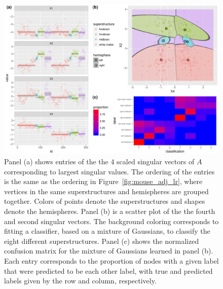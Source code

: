 \documentclass[journal,twoside,web]{ieeecolor}
\begin{document}
\begin{figure}[tbh!]
	\centering
	\includegraphics[width=.90\linewidth]{mouse_connectome_ase_w_error_table.pdf}
	\caption{
	Panel (a) shows entries of the the 4 scaled singular vectors  of $A$ corresponding to largest singular values.
	The ordering of the entries is the same as the ordering in Figure~\ref{fig:mouse_adj_lr}, where vertices in the same superstructures and hemispheres are grouped together. 
	Colors of points denote the superstructures and shapes denote the hemispheres.
	Panel (b) is a scatter plot of the the fourth and second singular vectors. 
	The background coloring corresponds to fitting a classifier, based on a mixture of Gaussians, to classify the eight different superstructures.
	Panel (c) shows the normalized confusion matrix for the mixture of Gaussians learned in panel (b).
    Each entry corresponds to the proportion of nodes with a given label that were predicted to be each other label,
    with true and predicted labels given by the row and column, respectively.}
	\label{fig:mouse_ase}
\end{figure}

\end{document}
